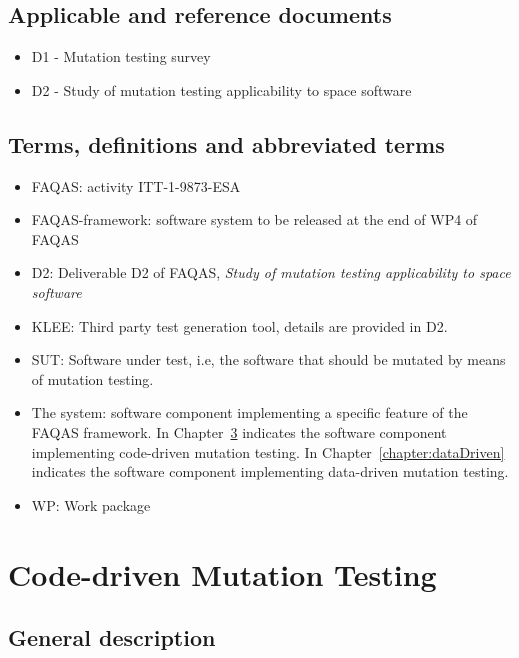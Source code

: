 
\section{Applicable and reference documents}

\begin{itemize}
\item{D1 - Mutation testing survey}
\item{D2 - Study of mutation testing applicability to space software}
\end{itemize}
\clearpage

\section{Terms, definitions and abbreviated terms}

\begin{itemize}
\item{FAQAS}: activity ITT-1-9873-ESA
\item{FAQAS-framework}: software system to be released at the end of WP4 of FAQAS
\item{D2}: Deliverable D2 of FAQAS, \emph{Study of mutation testing applicability to space software}
\item{KLEE}: Third party test generation tool, details are provided in D2.
\item{SUT}: Software under test, i.e, the software that should be mutated by means of mutation testing.
\item{The system}: software component implementing a specific feature of the FAQAS framework. In Chapter~\ref{chapter:codeDriven} indicates the software component implementing code-driven mutation testing. In Chapter~\ref{chapter:dataDriven} indicates the software component implementing  data-driven mutation testing.
\item{WP}: Work package
\end{itemize}

\clearpage


\chapter{Code-driven Mutation Testing}
\label{chapter:codeDriven}

\section{General description}


